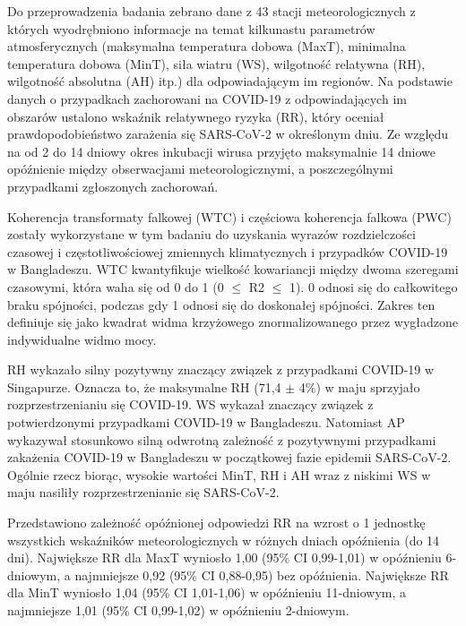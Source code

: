\documentclass[polish, twoside, 12pt, a4paper]{article}
\theoremstyle{definition}
\theoremstyle{plain}
\theoremstyle{remark}
\begin{document}
Do przeprowadzenia badania zebrano dane z 43 stacji meteorologicznych z których wyodrębniono informacje na temat kilkunastu parametrów atmosferycznych (maksymalna temperatura dobowa (MaxT), minimalna temperatura dobowa (MinT), siła wiatru (WS), wilgotność relatywna (RH), wilgotność absolutna (AH) itp.) dla odpowiadającym im regionów. Na podstawie danych o przypadkach zachorowani na COVID-19 z odpowiadających im obszarów ustalono wskaźnik relatywnego ryzyka (RR), który oceniał prawdopodobieństwo zarażenia się SARS-CoV-2 w określonym dniu. Ze względu na od 2 do 14 dniowy okres inkubacji wirusa przyjęto maksymalnie 14 dniowe opóźnienie między obserwacjami meteorologicznymi, a poszczególnymi przypadkami zgłoszonych zachorowań.

Koherencja transformaty falkowej (WTC) i częściowa koherencja falkowa (PWC) zostały wykorzystane w tym badaniu do uzyskania wyrazów rozdzielczości czasowej i częstotliwościowej zmiennych klimatycznych i przypadków COVID-19 w Bangladeszu. WTC kwantyfikuje wielkość kowariancji między dwoma szeregami czasowymi, która waha się od 0 do 1 (0 $\leq$ R2 $\leq$ 1). 0 odnosi się do całkowitego braku spójności, podczas gdy 1 odnosi się do doskonałej spójności. Zakres ten definiuje się jako kwadrat widma krzyżowego znormalizowanego przez wygładzone indywidualne widmo mocy. 

RH wykazało silny pozytywny znaczący związek z przypadkami COVID-19 w Singapurze. Oznacza to, że maksymalne RH (71,4 $\pm$ 4\%) w maju sprzyjało rozprzestrzenianiu się COVID-19. WS wykazał znaczący związek z potwierdzonymi przypadkami COVID-19 w Bangladeszu. Natomiast AP wykazywał stosunkowo silną odwrotną zależność z pozytywnymi przypadkami zakażenia COVID-19 w Bangladeszu w początkowej fazie epidemii SARS-CoV-2. Ogólnie rzecz biorąc, wysokie wartości MinT, RH i AH wraz z niskimi WS w maju nasiliły rozprzestrzenianie się SARS-CoV-2.

Przedstawiono zależność opóźnionej odpowiedzi RR na wzrost o 1 jednostkę wszystkich wskaźników meteorologicznych w różnych dniach opóźnienia (do 14 dni). Największe RR dla MaxT wyniosło 1,00 (95\% CI 0,99-1,01) w opóźnieniu 6-dniowym, a najmniejsze 0,92 (95\% CI 0,88-0,95) bez opóźnienia. Największe RR dla MinT wyniosło 1,04 (95\% CI 1,01-1,06) w opóźnieniu 11-dniowym, a najmniejsze 1,01 (95\% CI 0,99-1,02) w opóźnieniu 2-dniowym. 
\end{document}
